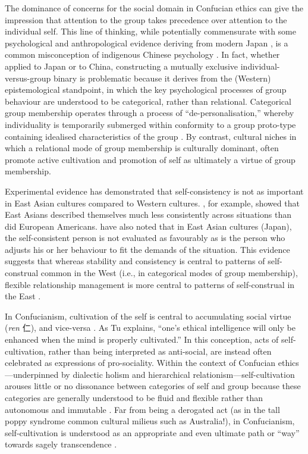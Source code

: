 \begin{CJK}{UTF8}{gbsn}
The dominance of concerns for the social domain in Confucian ethics can give the impression that attention to the group takes precedence over attention to the individual self.  This line of thinking, while potentially commensurate with some psychological and anthropological evidence deriving from modern Japan \citep{Kitayama2010b}, is a common misconception of indigenous Chinese psychology \citep{Tu1998}.  In fact, whether applied to Japan or to China, constructing a mutually exclusive individual-versus-group binary is problematic because it derives from the (Western) epistemological standpoint, in which the key psychological processes of group behaviour are understood to be categorical, rather than relational.  Categorical group membership operates through a process of ``de-personalisation,'' whereby individuality is temporarily submerged within conformity to a group proto-type containing idealised characteristics of the group \citep{Turner1987}.  By contrast, cultural niches in which a relational mode of group membership is culturally dominant, often promote active cultivation and promotion of self as ultimately a virtue of group membership.

Experimental evidence has demonstrated that self-consistency is not as important in East Asian cultures compared to Western cultures. \textcite{Suh2002}, for example, showed that East Asians described themselves much less consistently across situations than did European Americans.  \textcite{Kitayama1999} have also noted that in East Asian cultures (Japan), the self-consistent person is not evaluated as favourably as is the person who adjusts his or her behaviour to fit the demands of the situation.  This evidence suggests that whereas stability and consistency is central to patterns of self-construal common in the West (i.e., in categorical modes of group membership), flexible relationship management is more central to patterns of self-construal in the East \citep{Nisbett2001}.

In Confucianism, cultivation of the self is central to accumulating social virtue (\textit{ren} 仁), and vice-versa \citep{Hwang2012}. As Tu explains, ``one's ethical intelligence will only be enhanced when the mind is properly cultivated.''  In this conception, acts of self-cultivation, rather than being interpreted as anti-social, are instead often celebrated as expressions of pro-sociality.  Within the context of Confucian ethics---underpinned by dialectic holism and hierarchical relationism---self-cultivation arouses little or no dissonance between categories of self and group because these categories are generally understood to be fluid and flexible rather than autonomous and immutable \citep{Nisbett2003}.  Far from being a derogated act (as in the tall poppy syndrome common cultural milieus such as Australia!), in Confucianism, self-cultivation is understood as an appropriate and even ultimate path or ``way'' towards sagely transcendence \citep[106]{Hwang2012}.


\end{CJK}
